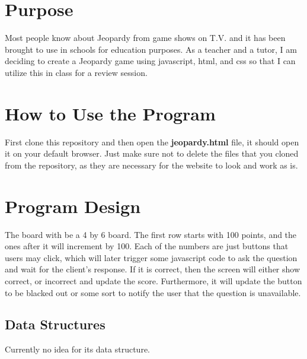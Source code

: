 \documentclass{article}
\title{\ASSIGNMENT}
\author{\NAME}
\date{\CLASS}
\begin{document}
\pagestyle{fancy}
\fancyfoot{}
\fancyhead{}
\fancyfoot[L]{\ASSIGNMENT\ -- \CLASS\ -- \NAME}
\fancyfoot[R]{\thepage}

\maketitle


\section{Purpose}

Most people know about Jeopardy from game shows on T.V. and it has been brought to use in schools for education purposes. As a teacher and a tutor, I am deciding to create a Jeopardy game using javascript, html, and css so that I can utilize this in class for a review session. 

\section{How to Use the Program}

First clone this repository and then open the \textbf{jeopardy.html} file, it should open it on your default browser. Just make sure not to delete the files that you cloned from the repository, as they are necessary for the website to look and work as is.

\section{Program Design}

The board with be a 4 by 6 board. The first row starts with 100 points, and the ones after it will increment by 100. Each of the numbers are just buttons that users may click, which will later trigger some javascript code to ask the question and wait for the client's response. If it is correct, then the screen will either show correct, or incorrect and update the score. Furthermore, it will update the button to be blacked out or some sort to notify the user that the question is unavailable.

\subsection{Data Structures}

Currently no idea for its data structure.
\end{document}
